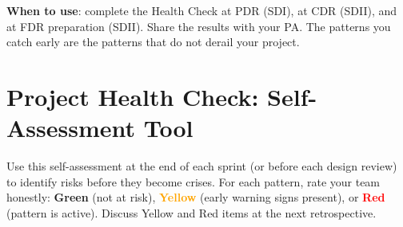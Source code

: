 \textbf{When to use}: complete the Health Check at PDR (SDI), at CDR (SDII), and at FDR preparation (SDII). Share the results with your PA. The patterns you catch early are the patterns that do not derail your project.




\section*{Project Health Check: Self-Assessment Tool}
Use this self-assessment at the end of each sprint (or before each design review) to identify risks before they become crises. For each pattern, rate your team honestly: \textcolor{green!60!black}{\textbf{Green}} (not at risk), \textcolor{orange}{\textbf{Yellow}} (early warning signs present), or \textcolor{red}{\textbf{Red}} (pattern is active). Discuss Yellow and Red items at the next retrospective.

